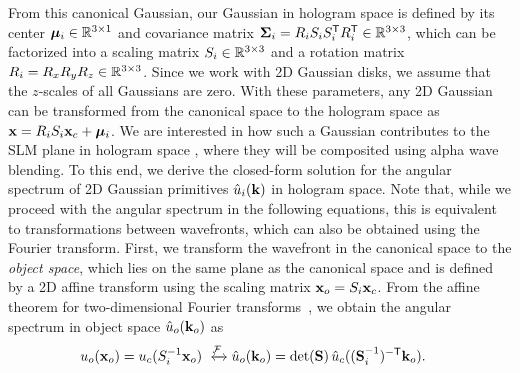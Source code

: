 From this canonical Gaussian, our Gaussian in hologram space is defined by its center $\bm{\mu}_i \in \mathbb{R}^{{3} \times 1}$ and covariance matrix $\mathbf{\Sigma}_i = R_i S_i S_i^\mathsf{T} R_i^\mathsf{T} \in \mathbb{R}^{{3}\times{3}}$, which can be factorized into a scaling matrix $S_i \in \mathbb{R}^{{3}\times{3}}$ and a rotation matrix $R_i = R_xR_yR_z \in \mathbb{R}^{{3}\times{3}}$. Since we work with 2D Gaussian disks, we assume that the $z$-scales of all Gaussians are zero. With these parameters, any 2D Gaussian can be transformed from the canonical space to the hologram space as $\mathbf{x} = R_i S_i \mathbf{x}_c + \bm{\mu}_i$. We are interested in how such a Gaussian contributes to the SLM plane in hologram space , where they will be composited using alpha wave blending. To this end, we derive the closed-form solution for the angular spectrum of 2D Gaussian primitives $\hat{u}_i (\mathbf{k})$ in hologram space. Note that, while we proceed with the angular spectrum in the following equations, this is equivalent to transformations between wavefronts, which can also be obtained using the Fourier transform.
First, we transform the wavefront in the canonical space to the \textit{object space}, which lies on the same plane as the canonical space and is defined by a 2D affine transform using the scaling matrix $ \mathbf{x}_o = S_i \mathbf{x}_c$. From the affine theorem for two-dimensional Fourier transforms~\cite{bracewell1993affine}, we obtain the angular spectrum in object space $\hat{u}_o(\mathbf{k}_o)$ as%
\begin{align}    
u_\objectspace(\coordinate_\objectspace) = u_\canonicalspace(\sca_\idx^{-1} \coordinate_\objectspace) & \xleftrightarrow{\fourier} \angularspectrum_\objectspace(\mathbf{k}_\objectspace) = \det(\mathbf{\sca} )\,\angularspectrum_\canonicalspace(\mathbf{(\sca}_i^{-1})^{-\mathsf{T}} \mathbf{k}_\objectspace) .\label{eq:affine_2d}  
\end{align} %

